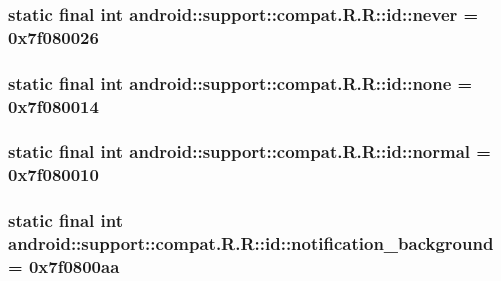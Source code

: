\hypertarget{classandroid_1_1support_1_1compat_1_1_r_1_1id_611455dfbbe4f72a3ba53f83f498ad50}{
\subsubsection[{never}]{\setlength{\rightskip}{0pt plus 5cm}static final int android::support::compat.R.R::id::never = 0x7f080026}}
\label{classandroid_1_1support_1_1compat_1_1_r_1_1id_611455dfbbe4f72a3ba53f83f498ad50}


\hypertarget{classandroid_1_1support_1_1compat_1_1_r_1_1id_427b69f47aee5c066dfde6f66ba8a81b}{
\subsubsection[{none}]{\setlength{\rightskip}{0pt plus 5cm}static final int android::support::compat.R.R::id::none = 0x7f080014}}
\label{classandroid_1_1support_1_1compat_1_1_r_1_1id_427b69f47aee5c066dfde6f66ba8a81b}


\hypertarget{classandroid_1_1support_1_1compat_1_1_r_1_1id_2cfb0de8fba31a69034095caf6b0aeed}{
\subsubsection[{normal}]{\setlength{\rightskip}{0pt plus 5cm}static final int android::support::compat.R.R::id::normal = 0x7f080010}}
\label{classandroid_1_1support_1_1compat_1_1_r_1_1id_2cfb0de8fba31a69034095caf6b0aeed}


\hypertarget{classandroid_1_1support_1_1compat_1_1_r_1_1id_4201cc1aa9e820259b84b1f101318f91}{
\subsubsection[{notification\_\-background}]{\setlength{\rightskip}{0pt plus 5cm}static final int android::support::compat.R.R::id::notification\_\-background = 0x7f0800aa}}
\label{classandroid_1_1support_1_1compat_1_1_r_1_1id_4201cc1aa9e820259b84b1f101318f91}



